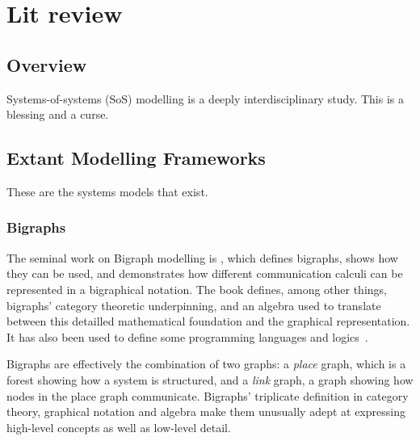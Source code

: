 \documentclass[draft,12pt]{article}
\begin{document}







\chapter{Lit review}

\section{Overview}

Systems-of-systems (SoS) modelling is a deeply interdisciplinary study. This is a blessing and a curse.
\par


\section{Extant Modelling Frameworks}
These are the systems models that exist.


\subsection{Bigraphs}

The seminal work on Bigraph modelling is \cite{milner2009space}, which defines
bigraphs, shows how they can be used, and demonstrates how different
communication calculi can be represented in a bigraphical notation. The book
defines, among other things, bigraphs' category theoretic underpinning, and an
algebra used to translate between this detailled mathematical foundation and the
graphical representation. It has also been used to define some programming
languages and
logics~\cite{Perrone:2012:MCB:2245276.2231985,sevegnani2015bigraphs}.
\par

Bigraphs are effectively the combination of two graphs: a \emph{place} graph,
which is a forest showing how a system is structured, and a \emph{link} graph, a
graph showing how nodes in the place graph communicate. Bigraphs' triplicate
definition in category theory, graphical notation and algebra make them
unusually adept at expressing high-level concepts as well as low-level detail.
\par
\end{document}
